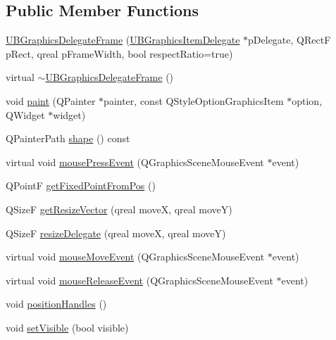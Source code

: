 \subsection*{Public Member Functions}
\begin{DoxyCompactItemize}
\item 
\hyperlink{class_u_b_graphics_delegate_frame_a1fe045788e162a9a91ff51296caa307b}{U\-B\-Graphics\-Delegate\-Frame} (\hyperlink{class_u_b_graphics_item_delegate}{U\-B\-Graphics\-Item\-Delegate} $\ast$p\-Delegate, Q\-Rect\-F p\-Rect, qreal p\-Frame\-Width, bool respect\-Ratio=true)
\item 
virtual \hyperlink{class_u_b_graphics_delegate_frame_a093fc84b2b05ef50abf1558f45c43bd5}{$\sim$\-U\-B\-Graphics\-Delegate\-Frame} ()
\item 
void \hyperlink{class_u_b_graphics_delegate_frame_a3c7463fa5f0cbfe7d690ac5baba6cd2d}{paint} (Q\-Painter $\ast$painter, const Q\-Style\-Option\-Graphics\-Item $\ast$option, Q\-Widget $\ast$widget)
\item 
Q\-Painter\-Path \hyperlink{class_u_b_graphics_delegate_frame_a8dd31cb4d54fadb0b0f5a569301b5771}{shape} () const 
\item 
virtual void \hyperlink{class_u_b_graphics_delegate_frame_aadfb632f3727cd11b51d25dfb40bb93b}{mouse\-Press\-Event} (Q\-Graphics\-Scene\-Mouse\-Event $\ast$event)
\item 
Q\-Point\-F \hyperlink{class_u_b_graphics_delegate_frame_aa4e3ee0bd5cab2b34bca60f6d52bbdd7}{get\-Fixed\-Point\-From\-Pos} ()
\item 
Q\-Size\-F \hyperlink{class_u_b_graphics_delegate_frame_a04bcf36a2524e3c7d8edd30aa937ec55}{get\-Resize\-Vector} (qreal move\-X, qreal move\-Y)
\item 
Q\-Size\-F \hyperlink{class_u_b_graphics_delegate_frame_a3a40fb15b09582d5b354fa4c7811f13e}{resize\-Delegate} (qreal move\-X, qreal move\-Y)
\item 
virtual void \hyperlink{class_u_b_graphics_delegate_frame_a344fb33c44bb0e803771f0b676553cb7}{mouse\-Move\-Event} (Q\-Graphics\-Scene\-Mouse\-Event $\ast$event)
\item 
virtual void \hyperlink{class_u_b_graphics_delegate_frame_ad5d5179c91d4e58ca81861749c9df527}{mouse\-Release\-Event} (Q\-Graphics\-Scene\-Mouse\-Event $\ast$event)
\item 
void \hyperlink{class_u_b_graphics_delegate_frame_abfe38268d0d095ab895a27c0a8b5a833}{position\-Handles} ()
\item 
void \hyperlink{class_u_b_graphics_delegate_frame_a3ec6ba01142a1b7ed2249d65efac82d2}{set\-Visible} (bool visible)

\end{DoxyCompactItemize}
